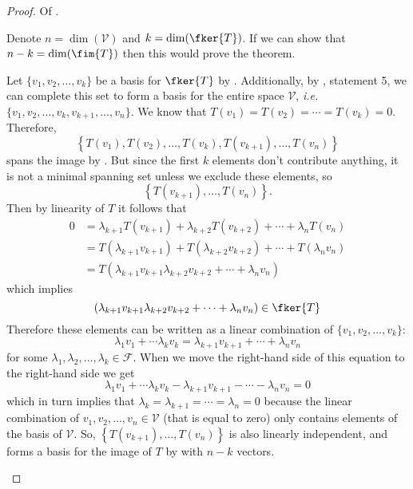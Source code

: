 \begin{proof}
	Of .
	\begin{flushleft}
		Denote $n=\dim(\mathcal{V})$ and $k=\dim(\fker{T})$. If we can show that
		$n-k=\dim(\fim{T})$ then this would prove the theorem.
	\end{flushleft}
	\begin{flushleft}
		Let $\{v_1,v_2,\dots,v_k\}$ be a basis for $\fker{T}$ by .
		Additionally, by , statement 5,
		we can complete this set to form a basis for the entire space $\mathcal{V}$,
		\textit{i.e.} $\{v_1,v_2,\dots,v_k,v_{k+1},\dots,v_n\}$. We know that
		$T(v_1)=T(v_2)=\cdots=T(v_k)=0$. Therefore,
		\begin{equation*}
			\left\{T(v_1),T(v_2),\dots,T(v_k),T(v_{k+1}),\dots,T(v_n)\right\}
		\end{equation*}
		spans the image by . But since the first
		$k$ elements don't contribute anything, it is not a minimal spanning set
		unless we exclude these elements, so
		\begin{equation*}
			\left\{T(v_{k+1}),\dots,T(v_n)\right\}.
		\end{equation*}
		Then by linearity of $T$ it follows that
		\begin{align*}
			0 & =\lambda_{k+1}T(v_{k+1})+\lambda_{k+2}T(v_{k+2})+\cdots+\lambda_nT(v_n) \\
			  & =T(\lambda_{k+1}v_{k+1})+T(\lambda_{k+2}v_{k+2})+\cdots+T(\lambda_nv_n) \\
			  & =T(\lambda_{k+1}v_{k+1}\lambda_{k+2}v_{k+2}+\cdots+\lambda_nv_n)
		\end{align*}
		which implies
		\begin{equation*}
			\left(\lambda_{k+1}v_{k+1}\lambda_{k+2}v_{k+2}+\cdots+\lambda_nv_n\right)\in\fker{T}
		\end{equation*}
		Therefore these elements can be written as a linear combination of $\{v_1,v_2,\dots,v_k\}$:
		\begin{equation*}
			\lambda_1v_1+\cdots\lambda_kv_k=\lambda_{k+1}v_{k+1}+\cdots+\lambda_nv_n
		\end{equation*}
		for some $\lambda_1,\lambda_2,\dots,\lambda_k\in\mathcal{F}$. When we move
		the right-hand side of this equation to the right-hand side we get
		\begin{equation*}
			\lambda_1v_1+\cdots\lambda_kv_k-\lambda_{k+1}v_{k+1}-\cdots-\lambda_nv_n=0
		\end{equation*}
		which in turn implies that $\lambda_k=\lambda_{k+1}=\cdots=\lambda_n=0$ because
		the linear combination of $v_1,v_2,\dots,v_n\in\mathcal{V}$ (that is equal to
		zero) only contains elements of the basis of $\mathcal{V}$. So,
		$\left\{T(v_{k+1}),\dots,T(v_n)\right\}$ is also linearly independent, and
		forms a basis for the image of $T$ by 
		with $n-k$ vectors.
	\end{flushleft}
\end{proof}

